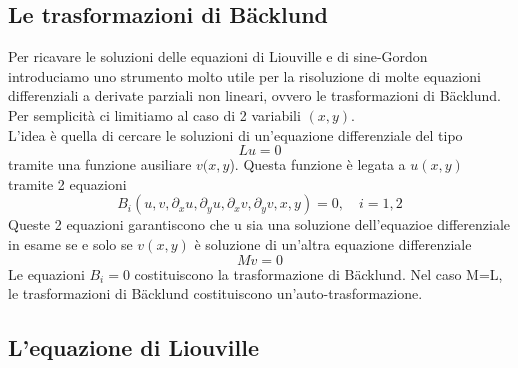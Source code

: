 \documentclass[a4paper,11pt]{report}
\begin{document}
\subsection{Le trasformazioni di B{\"a}cklund}
Per ricavare le soluzioni delle equazioni di Liouville e di sine-Gordon introduciamo uno strumento molto utile per la risoluzione di molte equazioni differenziali a derivate parziali non lineari, ovvero le trasformazioni di B{\"a}cklund.\\
Per semplicità ci limitiamo al caso di 2 variabili $(x,y)$.\\
L'idea è quella di cercare le soluzioni di un'equazione differenziale del tipo
$$
L u=0
$$
tramite una funzione ausiliare $v(x,y$). Questa funzione è legata a $u(x,y)$ tramite 2 equazioni
$$
B_i(u,v,\partial_x u, \partial_y u, \partial_x v, \partial_y v,x,y)=0, \quad i=1,2
$$
Queste 2 equazioni garantiscono che u sia una soluzione dell'equazioe differenziale in esame se e solo se $v(x,y)$ è soluzione di un'altra equazione differenziale
$$
Mv=0
$$
Le equazioni $B_i=0$ costituiscono la trasformazione di B{\"a}cklund. Nel caso M=L, le trasformazioni di B{\"a}cklund costituiscono un'auto-trasformazione.


\subsection{L'equazione di Liouville}
\end{document}
